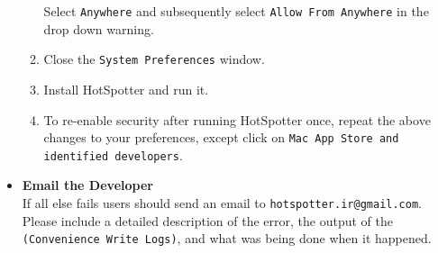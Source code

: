 \documentclass[a4paper,10pt]{article}
\makeatletter
\newcommand{\developeremail}{{\tt hotspotter.ir@gmail.com}}
\makeatother
\begin{document}
\begin{itemize}
\begin{enumerate}
\begin{Verbatim}
                \end{Verbatim}

                Select {\tt Anywhere} and subsequently select {\tt Allow From Anywhere} in the drop down warning.

            \item Close the {\tt System Preferences} window.
            \item Install HotSpotter and run it.
            \item To re-enable security after running HotSpotter once,
                repeat the above changes to your preferences, except click on
                \texttt{Mac App Store and identified developers}.
        \end{enumerate}


    \item \textbf{Email the Developer}\\
        If all else fails users should send an email to \developeremail{}.
        Please include a detailed description of the error, the output of the {\tt
            (Convenience \textrightarrow{} Write Logs)}, and what was being done when it
            happened.\\
    \end{itemize}
\end{document}
